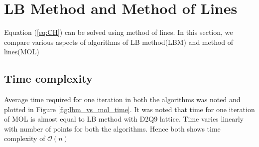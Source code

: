 \documentclass{article}
\begin{document}
\section{LB Method and Method of Lines}
Equation (\ref{eq:CH}) can be solved using method of lines. In this section, we compare various aspects of algorithms of LB method(LBM) and method of lines(MOL)
\subsection*{Time complexity}
Average time required for one iteration in both the algorithms was noted and plotted in Figure \ref*{fig:lbm_vs_mol_time}. It was noted that time for one iteration of MOL is almost equal to LB method with D2Q9 lattice. Time varies linearly with number of points for both the algorithms. Hence both shows time complexity of $\mathcal{O}(n)$
\end{document}
